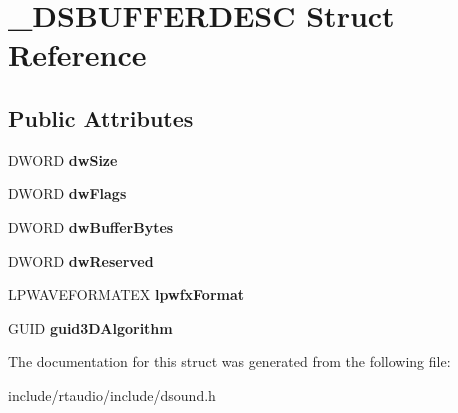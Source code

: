 \hypertarget{struct___d_s_b_u_f_f_e_r_d_e_s_c}{}\section{\+\_\+\+D\+S\+B\+U\+F\+F\+E\+R\+D\+E\+SC Struct Reference}
\label{struct___d_s_b_u_f_f_e_r_d_e_s_c}
\subsection*{Public Attributes}
\begin{DoxyCompactItemize}
\item 
D\+W\+O\+RD {\bfseries dw\+Size}\hypertarget{struct___d_s_b_u_f_f_e_r_d_e_s_c_a2ca872d44a4b06774d9971d12deecea7}{}\label{struct___d_s_b_u_f_f_e_r_d_e_s_c_a2ca872d44a4b06774d9971d12deecea7}

\item 
D\+W\+O\+RD {\bfseries dw\+Flags}\hypertarget{struct___d_s_b_u_f_f_e_r_d_e_s_c_a6559b8fa8887250fcad280ddb2ce4691}{}\label{struct___d_s_b_u_f_f_e_r_d_e_s_c_a6559b8fa8887250fcad280ddb2ce4691}

\item 
D\+W\+O\+RD {\bfseries dw\+Buffer\+Bytes}\hypertarget{struct___d_s_b_u_f_f_e_r_d_e_s_c_ab5c1aa1b02d6d0f180f1d94de4f25de3}{}\label{struct___d_s_b_u_f_f_e_r_d_e_s_c_ab5c1aa1b02d6d0f180f1d94de4f25de3}

\item 
D\+W\+O\+RD {\bfseries dw\+Reserved}\hypertarget{struct___d_s_b_u_f_f_e_r_d_e_s_c_af3db412468c7b66da7be8e3ea9b9ffb6}{}\label{struct___d_s_b_u_f_f_e_r_d_e_s_c_af3db412468c7b66da7be8e3ea9b9ffb6}

\item 
L\+P\+W\+A\+V\+E\+F\+O\+R\+M\+A\+T\+EX {\bfseries lpwfx\+Format}\hypertarget{struct___d_s_b_u_f_f_e_r_d_e_s_c_affcad592af32c7abfd9776445ee59894}{}\label{struct___d_s_b_u_f_f_e_r_d_e_s_c_affcad592af32c7abfd9776445ee59894}

\item 
G\+U\+ID {\bfseries guid3\+D\+Algorithm}\hypertarget{struct___d_s_b_u_f_f_e_r_d_e_s_c_a9b687752e00b07fe987dad1e8e1ba767}{}\label{struct___d_s_b_u_f_f_e_r_d_e_s_c_a9b687752e00b07fe987dad1e8e1ba767}

\end{DoxyCompactItemize}


The documentation for this struct was generated from the following file\+:\begin{DoxyCompactItemize}
\item 
include/rtaudio/include/dsound.\+h\end{DoxyCompactItemize}
